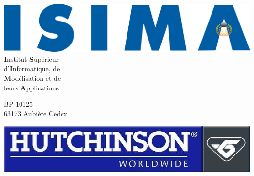 \cleardoublepage

\thispagestyle{empty}

\makeatletter %



\begin{multicols}{2}
	\begin{flushleft}
	
	
		\includegraphics[scale=0.09]{images/Logo_ISIMA.png}					\\
		
		\textbf{I}nstitut \textbf{S}upérieur								\\
		d'\textbf{I}nformatique, de											\\
		\textbf{M}odélisation et de											\\
		leurs \textbf{A}pplications	
		
		\vspace*{0.5cm}
		
		BP 10125															\\
		63173 Aubière Cedex
		
		
	\end{flushleft}
\columnbreak
	\begin{flushright}
	
	
		\includegraphics[scale=0.2]{images/Logo_Hutchinson.jpg}				\\
		

\end{flushright}
\end{multicols}
